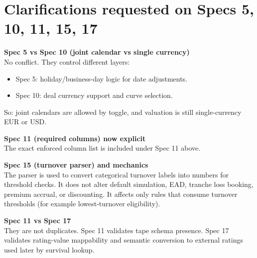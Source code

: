 \documentclass[11pt]{article}
\begin{document}
\section*{Clarifications requested on Specs 5, 10, 11, 15, 17}
\textbf{Spec 5 vs Spec 10 (joint calendar vs single currency)}\\
No conflict. They control different layers:
\begin{itemize}
  \item Spec 5: holiday/business-day logic for date adjustments.
  \item Spec 10: deal currency support and curve selection.
\end{itemize}
So: joint calendars are allowed by toggle, and valuation is still single-currency EUR or USD.

\textbf{Spec 11 (required columns) now explicit}\\
The exact enforced column list is included under Spec 11 above.

\textbf{Spec 15 (turnover parser) and mechanics}\\
The parser is used to convert categorical turnover labels into numbers for threshold checks. It does not alter default simulation, EAD, tranche loss booking, premium accrual, or discounting. It affects only rules that consume turnover thresholds (for example lowest-turnover eligibility).

\textbf{Spec 11 vs Spec 17}\\
They are not duplicates. Spec 11 validates tape schema presence. Spec 17 validates rating-value mappability and semantic conversion to external ratings used later by survival lookup.
\end{document}
